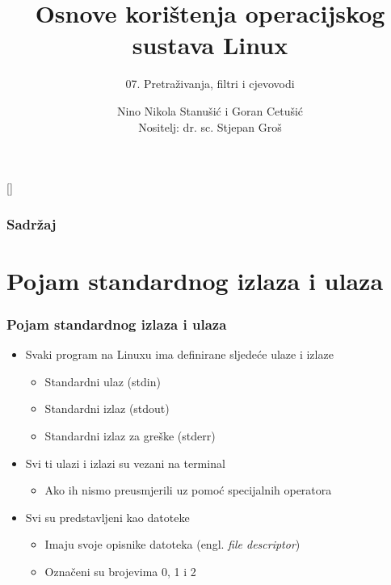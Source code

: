\documentclass{beamer}
\title{Osnove korištenja operacijskog sustava Linux}
\subtitle{07. Pretraživanja, filtri i cjevovodi}
\author[Nino Nikola Stanušić i Goran Cetušić]{Nino Nikola Stanušić i Goran Cetušić\\{\small Nositelj: dr. sc. Stjepan Groš}}
\institute[FER]{Sveučilište u Zagrebu \\
				Fakultet elektrotehnike i računarstva}
\date{\todayiso}
\begin{document}
{
[] %

\begin{frame}
\maketitle
\end{frame}
}

\begin{frame}
\frametitle{Sadržaj}
\tableofcontents
\end{frame}

\section{Pojam standardnog izlaza i ulaza}
\begin{frame}[t]
\frametitle{Pojam standardnog izlaza i ulaza}
\begin{itemize}
  \item Svaki program na Linuxu ima definirane sljedeće ulaze i izlaze
  \begin{itemize}
    \item Standardni ulaz (stdin)
    \item Standardni izlaz (stdout)
    \item Standardni izlaz za greške (stderr)
  \end{itemize}
  \item Svi ti ulazi i izlazi su vezani na terminal
  \begin{itemize}
    \item Ako ih nismo preusmjerili uz pomoć specijalnih operatora
  \end{itemize}
  \item Svi su predstavljeni kao datoteke
  \begin{itemize}
    \item Imaju svoje opisnike datoteka (engl. \emph{file descriptor})
    \item Označeni su brojevima 0, 1 i 2
  \end{itemize}
\end{itemize}
\end{frame}
\end{document}
